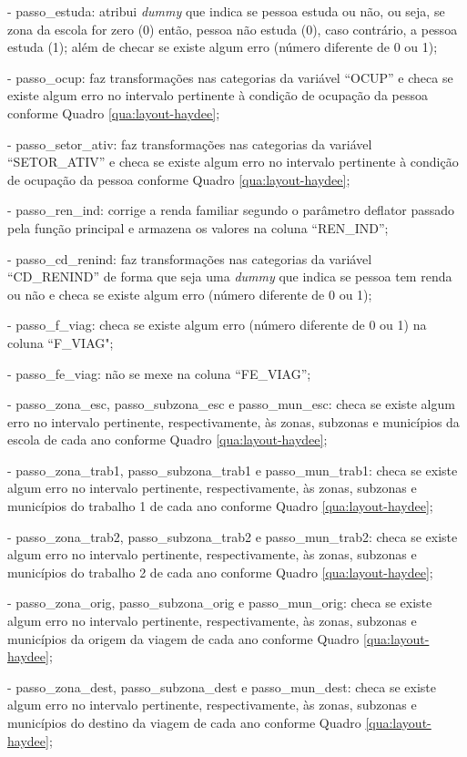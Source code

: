 \begin{compactitem}[]
\item - passo_estuda: atribui \textit{dummy} que indica se pessoa estuda ou não, ou seja, se zona da escola for zero (0) então, pessoa não estuda (0), caso contrário, a pessoa estuda (1); além de checar se existe algum erro (número diferente de 0 ou 1);
\item - passo_ocup: faz transformações nas categorias da variável ``OCUP'' e checa se existe algum erro no intervalo pertinente à condição de ocupação da pessoa conforme Quadro \ref{qua:layout-haydee};
\item - passo_setor_ativ: faz transformações nas categorias da variável ``SETOR_ATIV'' e checa se existe algum erro no intervalo pertinente à condição de ocupação da pessoa conforme Quadro \ref{qua:layout-haydee}; 
\item - passo_ren_ind: corrige a renda familiar segundo o parâmetro deflator passado pela função principal e armazena os valores na coluna ``REN_IND'';
\item - passo_cd_renind: faz transformações nas categorias da variável ``CD_RENIND'' de forma que seja uma \textit{dummy} que indica se pessoa tem renda ou não e checa se existe algum erro (número diferente de 0 ou 1);
\item - passo_f_viag: checa se existe algum erro (número diferente de 0 ou 1) na coluna ``F_VIAG";
\item - passo_fe_viag: não se mexe na coluna ``FE_VIAG'';
\item - passo_zona_esc, passo_subzona_esc e passo_mun_esc: checa se existe algum erro no intervalo pertinente, respectivamente, às zonas, subzonas e municípios da escola de cada ano conforme Quadro \ref{qua:layout-haydee};
\item - passo_zona_trab1, passo_subzona_trab1 e passo_mun_trab1: checa se existe algum erro no intervalo pertinente, respectivamente, às zonas, subzonas e municípios do trabalho 1 de cada ano conforme Quadro \ref{qua:layout-haydee};
\item - passo_zona_trab2, passo_subzona_trab2 e passo_mun_trab2: checa se existe algum erro no intervalo pertinente, respectivamente, às zonas, subzonas e municípios do trabalho 2 de cada ano conforme Quadro \ref{qua:layout-haydee};
\item - passo_zona_orig, passo_subzona_orig e passo_mun_orig: checa se existe algum erro no intervalo pertinente, respectivamente, às zonas, subzonas e municípios da origem da viagem de cada ano conforme Quadro \ref{qua:layout-haydee};
\item - passo_zona_dest, passo_subzona_dest e passo_mun_dest: checa se existe algum erro no intervalo pertinente, respectivamente, às zonas, subzonas e municípios do destino da viagem de cada ano conforme Quadro \ref{qua:layout-haydee};

\end{compactitem}
